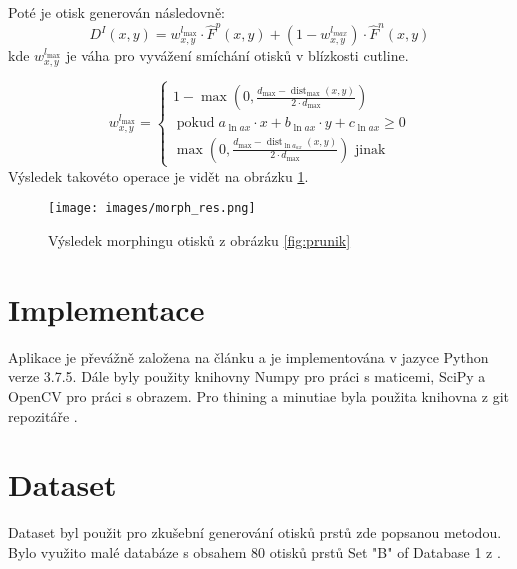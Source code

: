 \documentclass[a4paper,11pt]{article}
\begin{document}
\begin{multicols*}{2}
    Poté je otisk generován následovně: 
    \begin{equation}
        D^{I}(x, y)=w_{x, y}^{l_{\max }} \cdot \hat{F}^{p}(x, y)+\left(1-w_{x, y}^{l_{m a x}}\right) \cdot \hat{F}^{n}(x, y)
    \end{equation}
    kde $w_{x, y}^{l_{\max }}$ je váha pro vyvážení smíchání otisků v blízkosti cutline.
    
    \begin{equation}
        w_{x, y}^{l_{\max }}=\left\{\begin{array}{c}
1-\max \left(0, \frac{d_{\max }-\operatorname{dist}_{\max }(x, y)}{2 \cdot d_{\max }}\right) \\
\operatorname{pokud} a_{\ln a x} \cdot x+b_{\ln a x} \cdot y+c_{\ln a x} \geq 0 \\
\max \left(0, \frac{d_{\max }-\operatorname{dist}_{\ln a_{a x}}(x, y)}{2 \cdot d_{\max }}\right) \text { jinak }
\end{array}\right.
    \end{equation}
    Výsledek takovéto operace je vidět na obrázku \ref{fig:morph}.
     \begin{figure}[H]
        \centering
            {\texttt{[image: images/morph\_res.png]}}\\
            \caption{Výsledek morphingu otisků z obrázku \ref{fig:prunik}}
            \label{fig:morph}
    \end{figure}
\section{Implementace}
    Aplikace je převážně založena na článku \cite{main} a je implementována v jazyce Python verze 3.7.5. Dále byly použity knihovny Numpy pro práci s maticemi, SciPy a OpenCV pro práci s obrazem. Pro thining a minutiae byla použita knihovna z git repozitáře \cite{gitlib}.

\section{Dataset}
    Dataset byl použit pro zkušební generování otisků prstů zde popsanou metodou. Bylo využito malé databáze s obsahem 80 otisků prstů Set "B" of Database 1 z \cite{database}.



\renewcommand{\refname}{Použitá literatura}

\end{multicols*}
\end{document}
